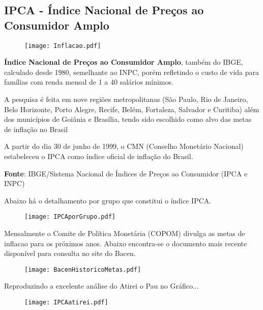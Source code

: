 \documentclass[../../relatorio.tex]{subfiles}
\begin{document}
\subsection{IPCA - Índice Nacional de Preços ao Consumidor Amplo}

\begin{figure}[ht]
  \begin{minipage}{0.70\textheight}
    \centering
      \texttt{[image: Inflacao.pdf]}
  \end{minipage}
\end{figure}


\textbf{Índice Nacional de Preços ao Consumidor Amplo}, também do IBGE, calculado desde 1980, semelhante ao INPC, porém refletindo o custo de vida para famílias com renda mensal de 1 a 40 salários mínimos.

A pesquisa é feita em nove regiões metropolitanas (São Paulo, Rio de Janeiro, Belo Horizonte, Porto Alegre, Recife, Belém, Fortaleza, Salvador e Curitiba) além dos municípios de Goiânia e Brasília, tendo sido escolhido como alvo das metas de inflação no Brasil

A partir do dia 30 de junho de 1999, o CMN (Conselho Monetário Nacional) estabeleceu o IPCA como índice oficial de inflação do Brasil.

\textbf{Fonte}: IBGE/Sistema Nacional de Índices de Preços ao Consumidor (IPCA e INPC)

\pagebreak

Abaixo há o detalhamento por grupo que constitui o índice IPCA.

\begin{figure}[!ht]
  \begin{minipage}{1.0\textwidth}
    \centering
      \texttt{[image: IPCAporGrupo.pdf]}
  \end{minipage}
\end{figure}

\pagebreak

Mensalmente o Comite de Política Monetária (COPOM) divulga as metas de inflacao para os próximos anos. Abaixo encontra-se o documento mais recente disponível para consulta no site do Bacen.

\begin{figure}[!ht]
  \begin{minipage}{\textwidth}
    \centering
      \texttt{[image: BacenHistoricoMetas.pdf]}
  \end{minipage}
\end{figure}

\pagebreak

Reproduzindo a excelente análise do Atirei o Pau no Gráfico...

\begin{figure}[!ht]
  \begin{minipage}{0.70\textwidth}
    \centering
      \texttt{[image: IPCAatirei.pdf]}
  \end{minipage}
\end{figure}

\pagebreak
\end{document}
